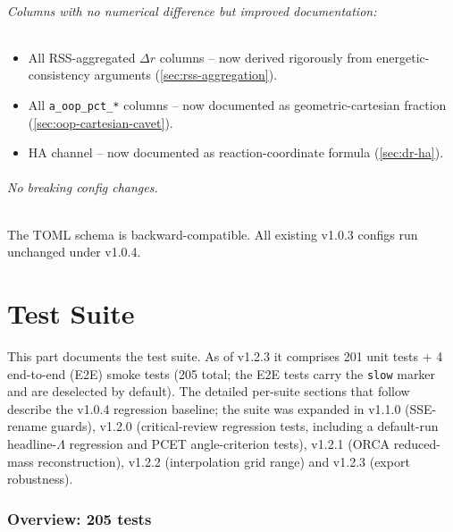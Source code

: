 \documentclass[10pt,a4paper,twoside]{article}
\begin{document}
\paragraph{Columns with no numerical difference but improved
documentation:}
\begin{itemize}
  \item All RSS-aggregated $\Delta r$ columns -- now derived
        rigorously from energetic-consistency arguments
        (\cref{sec:rss-aggregation}).
  \item All \texttt{a\_oop\_pct\_*} columns -- now documented as
        geometric-cartesian fraction (\cref{sec:oop-cartesian-cavet}).
  \item HA channel -- now documented as reaction-coordinate
        formula (\cref{sec:dr-ha}).
\end{itemize}

\paragraph{No breaking config changes.}
The TOML schema is backward-compatible. All existing v1.0.3
configs run unchanged under v1.0.4.

\part{Test Suite}
\label{sec:test-suite}

This part documents the test suite. As of v1.2.3 it comprises
201 unit tests + 4 end-to-end (E2E) smoke tests (205 total; the
E2E tests carry the \texttt{slow} marker and are deselected by
default). The detailed per-suite sections that follow describe the
v1.0.4 regression baseline; the suite was expanded in v1.1.0
(SSE-rename guards), v1.2.0 (critical-review regression tests,
including a default-run headline-$\Lambda$ regression and PCET
angle-criterion tests), v1.2.1 (ORCA reduced-mass reconstruction),
v1.2.2 (interpolation grid range) and v1.2.3 (export robustness).

\section{Overview: 205 tests}
\end{document}
